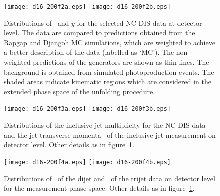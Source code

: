 \documentclass[12pt]{article}
\begin{document}
\clearpage

%

\begin{figure}[htb]
\begin{center}
   \texttt{[image: d16-200f2a.eps]}\textwidth
   \texttt{[image: d16-200f2b.eps]}
\end{center}
\caption{
  Distributions of \Qsq\ and $y$ for the selected NC DIS data at detector level. 
The data are compared to predictions obtained from the Rapgap and Djangoh MC simulations, which are weighted to achieve a better description of the data (labelled as `MC').
The non-weighted predictions of the generators are shown as thin lines.
The background is obtained from simulated photoproduction events.
The shaded areas indicate kinematic regions which are considered in the extended phase space of the unfolding procedure.
}
\label{figControlDIS}
\end{figure}

\begin{figure}[htb]
\begin{center}
   \texttt{[image: d16-200f3a.eps]}\textwidth
   \texttt{[image: d16-200f3b.eps]}
\end{center}
\caption{
  Distributions of the inclusive jet multiplicity for the NC DIS data and the jet transverse momenta \ptjet\ of the inclusive jet measurement on detector level.
  Other details as in figure~\ref{figControlDIS}.
 } 
\label{figControlJets}
\end{figure}


\begin{figure}[htb]
\begin{center}
   \texttt{[image: d16-200f4a.eps]}\textwidth
   \texttt{[image: d16-200f4b.eps]}
\end{center}
\caption{
  Distributions of \meanptdi\ of the dijet and \meanpttri\ of the trijet data on detector level for the measurement phase space.
  Other details as in figure~\ref{figControlDIS}.
}
\label{figControlDijet}
\end{figure}
\end{document}
